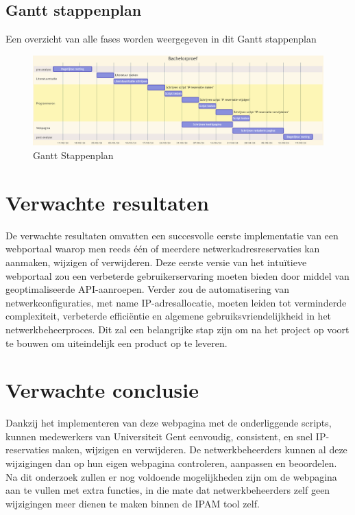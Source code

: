 \subsection{Gantt stappenplan}
Een overzicht van alle fases worden weergegeven in dit Gantt stappenplan
\begin{figure}[h!]
    \includegraphics[scale=0.39]{Gantt}
    \caption{Gantt Stappenplan}
    \label{Gantt Stappenplan}
\end{figure}


\section{Verwachte resultaten}
\label{sec:verwachte-resultaten}
De verwachte resultaten omvatten een succesvolle eerste implementatie van een webportaal waarop men reeds één of meerdere netwerkadresreservaties kan aanmaken, wijzigen of verwijderen. Deze eerste versie van het intuïtieve webportaal zou een verbeterde gebruikerservaring moeten bieden door middel van geoptimaliseerde API-aanroepen. Verder zou de automatisering van netwerkconfiguraties, met name IP-adresallocatie, moeten leiden tot verminderde complexiteit, verbeterde efficiëntie en algemene gebruiksvriendelijkheid in het netwerkbeheerproces. Dit zal een belangrijke stap zijn om na het project op voort te bouwen om uiteindelijk een product op te leveren.


\section{Verwachte conclusie}
\label{sec:discussie-conclusie}
Dankzij het implementeren van deze webpagina met de onderliggende scripts, kunnen medewerkers van Universiteit Gent eenvoudig, consistent, en snel IP-reservaties maken, wijzigen en verwijderen. De netwerkbeheerders kunnen al deze wijzigingen dan op hun eigen webpagina controleren, aanpassen en beoordelen.
Na dit onderzoek zullen er nog voldoende mogelijkheden zijn om de webpagina aan te vullen met extra functies, in die mate dat netwerkbeheerders zelf geen wijzigingen meer dienen te maken binnen de IPAM tool zelf.

